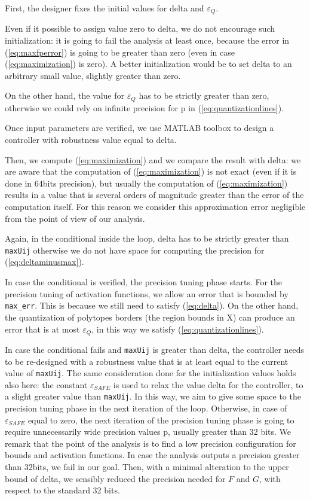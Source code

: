 \documentclass[sigconf]{acmart}
\newcommand{\statespace}{X}
\begin{document}
First, the designer fixes the initial values for delta and $\varepsilon_{Q}$.

Even if it possible to assign value zero to delta\cite{imperial}, we do not encourage such initialization: it is going to fail the analysis at least once, because the error in (\ref{eq:maxfperror}) is going to be greater than zero (even in case (\ref{eq:maximization}) is zero). A better initialization would be to set delta to an arbitrary small value, slightly greater than zero.

On the other hand, the value for $\varepsilon_{Q}$ has to be strictly greater than zero, otherwise we could rely on infinite precision for p in (\ref{eq:quantizationlines}).

Once input parameters are verified, we use MATLAB toolbox to design a controller with robustness value equal to delta. 

Then, we compute (\ref{eq:maximization}) and we compare the result with delta: we are aware that the computation of (\ref{eq:maximization}) is not exact (even if it is done in 64bits precision), but usually the computation of (\ref{eq:maximization}) results in a value that is several orders of magnitude greater than the error of the computation itself. For this reason we consider this approximation error negligible from the point of view of our analysis. 

Again, in the conditional inside the loop, delta has to be strictly greater than \texttt{maxUij} otherwise we do not have space for computing the precision for (\ref{eq:deltaminusmax}).

In case the conditional is verified,
the precision tuning phase starts.
For the precision tuning of activation functions, we allow an error that is bounded by \texttt{max\_err}. This is because we still need to satisfy (\ref{eq:delta}).
On the other hand, the quantization of polytopes borders (the region bounds in \statespace) can produce an error that is at most $\varepsilon_{Q}$, in this way we satisfy 
(\ref{eq:quantizationlines}).

In case the conditional fails and \texttt{maxUij} is greater than delta, the controller needs to be re-designed with a robustness value that is at least equal to the current value of \texttt{maxUij}. The same consideration done for the initialization values holds also here: the constant $\varepsilon_{SAFE}$ is used to relax the value delta for the controller, to a slight greater value than \texttt{maxUij}. In this way, we aim to give some space to the precision tuning phase in the next iteration of the loop. Otherwise, in case of $\varepsilon_{SAFE}$ equal to zero, the next iteration of the precision tuning phase is going to require unnecessarily wide precision values p, usually greater than 32 bits. 
We remark that the point of the analysis is to find a low precision configuration for bounds and activation functions.
In case the analysis outputs a precision greater than 32bits, we fail in our goal.
Then, with a minimal alteration to the upper bound of delta, we sensibly reduced the precision needed for $F$ and $G$, with respect to the standard 32 bits.
\end{document}

